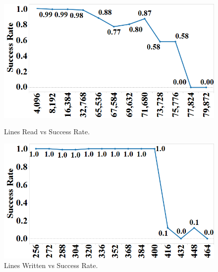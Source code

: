 \begin{figure}[h]%
\centering
\begin{minipage}[b]{.45\linewidth}
\centering
\includegraphics[width=\linewidth]{images/wttm_capacity_read_intel}
\caption{Lines Read vs Success Rate.}
\label{fig:wttm_capacity_read_intel}
\end{minipage}%
\quad
\begin{minipage}[b]{.45\linewidth}
\centering
\includegraphics[width=\linewidth]{images/wttm_capacity_write_intel}
\caption{Lines Written vs Success Rate.}
\label{fig:wttm_capacity_write_intel}
\end{minipage}
\end{figure}

